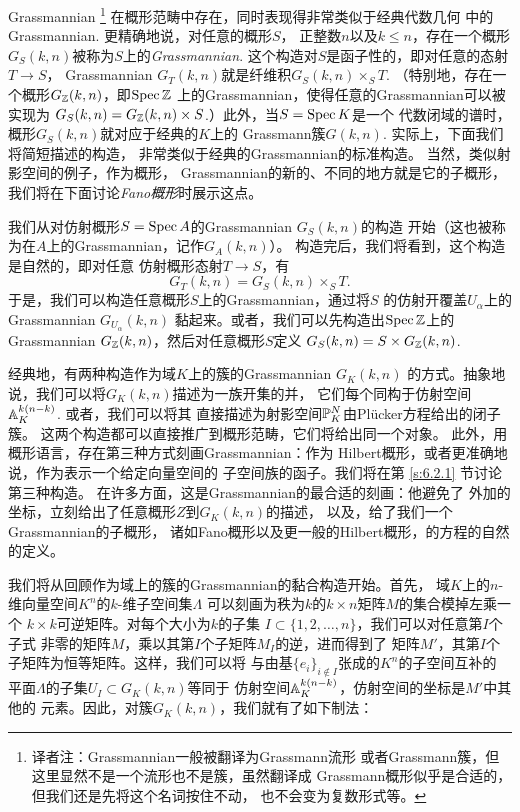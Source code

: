 Grassmannian%
\footnote{译者注：Grassmannian一般被翻译为Grassmann流形
或者Grassmann簇，但这里显然不是一个流形也不是簇，虽然翻译成
Grassmann概形似乎是合适的，但我们还是先将这个名词按住不动，
也不会变为复数形式等。}%
在概形范畴中存在，同时表现得非常类似于经典代数几何
中的Grassmannian. 更精确地说，对任意的概形$S$，
正整数$n$以及$k\leq n$，存在一个概形
$G_S(k,n)$被称为$S$上的\textit{Grassmannian}. 
这个构造对$S$是函子性的，即对任意的态射$T\to S$，
Grassmannian $G_T(k,n)$就是纤维积$G_S(k,n)\times_S T$. 
（特别地，存在一个概形$G_\zz(k,n)$，即$\spec \zz$
上的Grassmannian，使得任意的Grassmannian可以被实现为
$G_S(k,n)=G_\zz(k,n)\times S$.）此外，当$S=\spec K$是一个
代数闭域的谱时，概形$G_S(k,n)$就对应于经典的$K$上的
Grassmann簇$G(k,n)$. 实际上，下面我们将简短描述的构造，
非常类似于经典的Grassmannian的标准构造。%
当然，类似射影空间的例子，作为概形，
Grassmannian的新的、不同的地方就是它的子概形，
我们将在下面讨论\textit{Fano概形}时展示这点。

我们从对仿射概形$S=\spec A$的Grassmannian $G_S(k,n)$的构造
开始（这也被称为在$A$上的Grassmannian，记作$G_A(k,n)$）。
构造完后，我们将看到，这个构造是自然的，即对任意
仿射概形态射$T\to S$，有
\[
	G_T(k,n)=G_S(k,n)\times_S T.
\]
于是，我们可以构造任意概形$S$上的Grassmannian，通过将$S$
的仿射开覆盖$U_\alpha$上的Grassmannian $G_{U_\alpha}(k,n)$
黏起来。或者，我们可以先构造出$\spec\zz$上的Grassmannian
$G_{\zz}(k,n)$，然后对任意概形$S$定义
$G_S(k,n)=S\times G_\zz(k,n)$.

经典地，有两种构造作为域$K$上的簇的Grassmannian $G_K(k,n)$
的方式。抽象地说，我们可以将$G_K(k,n)$描述为一族开集的并，
它们每个同构于仿射空间$\A^{k(n-k)}_K$. 或者，我们可以将其
直接描述为射影空间$\P^N_K$由Pl\"{u}cker方程给出的闭子簇。
这两个构造都可以直接推广到概形范畴，它们将给出同一个对象。
此外，用概形语言，存在第三种方式刻画Grassmannian：作为
Hilbert概形，或者更准确地说，作为表示一个给定向量空间的
子空间族的函子。我们将在第 \ref{s:6.2.1} 节讨论第三种构造。
在许多方面，这是Grassmannian的最合适的刻画：他避免了
外加的坐标，立刻给出了任意概形$Z$到$G_K(k,n)$的描述，
以及，给了我们一个Grassmannian的子概形，
诸如Fano概形以及更一般的Hilbert概形，的方程的自然的定义。

我们将从回顾作为域上的簇的Grassmannian的黏合构造开始。首先，
域$K$上的$n$-维向量空间$K^n$的$k$-维子空间集$\Lambda$
可以刻画为秩为$k$的$k\times n$矩阵$M$的集合模掉左乘一个
$k\times k$可逆矩阵。对每个大小为$k$的子集
$I\subset \{1,2,\dots,n\}$，我们可以对任意第$I$个子式
非零的矩阵$M$，乘以其第$I$个子矩阵$M_I$的逆，进而得到了
矩阵$M'$，其第$I$个子矩阵为恒等矩阵。这样，我们可以将
与由基$\{e_i\}_{i\not\in I}$张成的$K^n$的子空间互补的
平面$\Lambda$的子集$U_I\subset G_K(k,n)$等同于
仿射空间$\A_K^{k(n-k)}$，仿射空间的坐标是$M'$中其他的
元素。因此，对簇$G_K(k,n)$，我们就有了如下制法：

